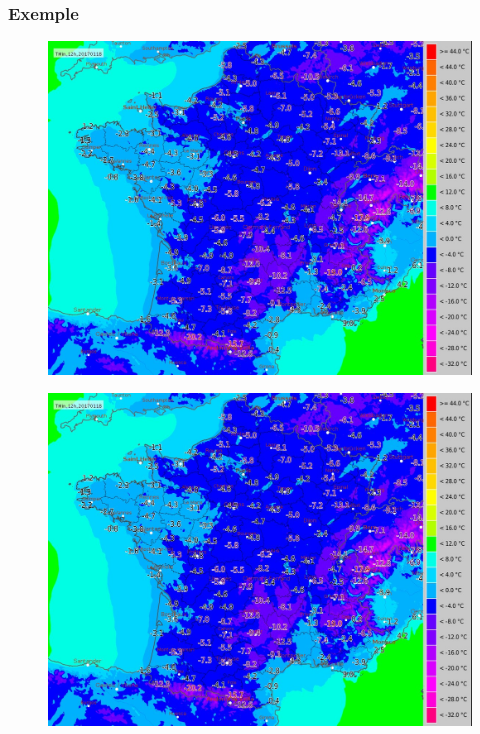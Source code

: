 \documentclass{beamer}
\begin{document}
\begin{frame} \frametitle{Exemple}
  \begin{figure}
    \centering
    \includegraphics[width=\textwidth,height=0.8\textheight,keepaspectratio]{fig/meteo_fr_scales_temp}
  \end{figure}
  \pause
  \begin{figure}
    \centering
    \includegraphics[width=\textwidth,height=0.8\textheight,keepaspectratio]{fig/meteo_fr_scales_temp}
  \end{figure}


\end{frame}
\end{document}
